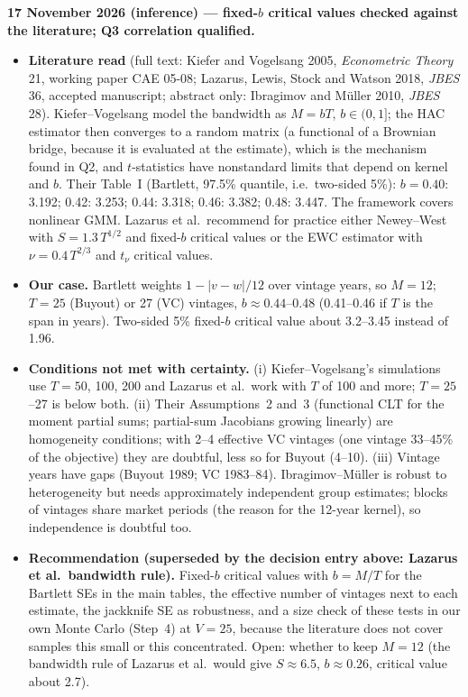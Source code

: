 \documentclass[11pt]{article}
\begin{document}
\textbf{17 November 2026 (inference) --- fixed-$b$ critical values checked against the literature; Q3 correlation qualified.}
\begin{itemize}
\item \textbf{Literature read} (full text: Kiefer and Vogelsang 2005, \emph{Econometric Theory} 21, working paper CAE 05-08; Lazarus, Lewis, Stock and Watson 2018, \emph{JBES} 36, accepted manuscript; abstract only: Ibragimov and M\"uller 2010, \emph{JBES} 28). Kiefer--Vogelsang model the bandwidth as $M=bT$, $b\in(0,1]$; the HAC estimator then converges to a random matrix (a functional of a Brownian bridge, because it is evaluated at the estimate), which is the mechanism found in Q2, and $t$-statistics have nonstandard limits that depend on kernel and $b$. Their Table~I (Bartlett, 97.5\% quantile, i.e.\ two-sided 5\%): $b=0.40$: 3.192; 0.42: 3.253; 0.44: 3.318; 0.46: 3.382; 0.48: 3.447. The framework covers nonlinear GMM. Lazarus et al.\ recommend for practice either Newey--West with $S=1.3\,T^{1/2}$ and fixed-$b$ critical values or the EWC estimator with $\nu=0.4\,T^{2/3}$ and $t_\nu$ critical values.
\item \textbf{Our case.} Bartlett weights $1-|v-w|/12$ over vintage years, so $M=12$; $T=25$ (Buyout) or 27 (VC) vintages, $b\approx0.44$--0.48 (0.41--0.46 if $T$ is the span in years). Two-sided 5\% fixed-$b$ critical value about 3.2--3.45 instead of 1.96.
\item \textbf{Conditions not met with certainty.} (i) Kiefer--Vogelsang's simulations use $T=50$, 100, 200 and Lazarus et al.\ work with $T$ of 100 and more; $T=25$--27 is below both. (ii) Their Assumptions~2 and~3 (functional CLT for the moment partial sums; partial-sum Jacobians growing linearly) are homogeneity conditions; with 2--4 effective VC vintages (one vintage 33--45\% of the objective) they are doubtful, less so for Buyout (4--10). (iii) Vintage years have gaps (Buyout 1989; VC 1983--84). Ibragimov--M\"uller is robust to heterogeneity but needs approximately independent group estimates; blocks of vintages share market periods (the reason for the 12-year kernel), so independence is doubtful too.
\item \textbf{Recommendation (superseded by the decision entry above: Lazarus et al.\ bandwidth rule).} Fixed-$b$ critical values with $b=M/T$ for the Bartlett SEs in the main tables, the effective number of vintages next to each estimate, the jackknife SE as robustness, and a size check of these tests in our own Monte Carlo (Step~4) at $V=25$, because the literature does not cover samples this small or this concentrated. Open: whether to keep $M=12$ (the bandwidth rule of Lazarus et al.\ would give $S\approx 6.5$, $b\approx0.26$, critical value about 2.7).

\end{itemize}
\end{document}

